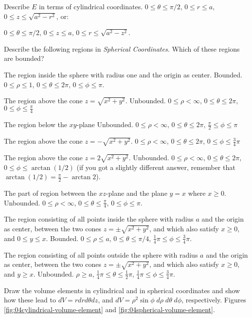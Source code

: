 \subprob  Describe $E$ in terms of cylindrical coordinates. 
\answer
$0\le\theta\le\pi/2$, $0\le r\le a$, $0\le z\le \sqrt{a^2-r^2}$, or:

$0\le\theta\le\pi/2$, $0\le z\le a$, $0\le r\le \sqrt{a^2-z^2}$.
\endanswer

\problem Describe the following regions in \emph{Spherical Coordinates.}  Which of these regions are bounded?

\subprob The region inside the sphere with radius one and the origin as center.
\answer
Bounded.  $0\le\rho\le 1$, $0\le\theta\le2\pi$, $0\le\phi\le\pi$.
\endanswer

\subprob The region above the cone $z= \sqrt{x^2+y^2}$.
\answer
Unbounded.  $0\le \rho<\infty$, $0\le\theta\le 2\pi$, $0\le\phi\le \frac\pi4$
\endanswer

\subprob The region below the $xy$-plane
\answer
Unbounded.  $0\le \rho<\infty$, $0\le\theta\le 2\pi$, $\frac\pi2 \le \phi \le \pi$
\endanswer

\subprob The region above the cone $z= - \sqrt{x^2+y^2}$.
\answer
$0\le \rho<\infty$, $0\le\theta\le 2\pi$, $0\le\phi\le \frac34\pi$
\endanswer

\subprob The region above the cone $z=2\sqrt{x^2+y^2}$.
\answer
Unbounded.
$0\le \rho<\infty$, $0\le\theta\le 2\pi$, $0\le\phi\le \arctan(1/2)$
(if you got a slightly different answer, remember that $\arctan(1/2) = \frac{\pi} {2} - \arctan 2$).
\endanswer

\subprob The part of region between the $xz$-plane and the plane $y=x$ where $x\ge0$.
\answer
Unbounded.  $0\le\rho<\infty$, $0\le\theta\le\frac\pi4$, $0\le\phi\le\pi$.
\endanswer

\subprob The region consisting of all points inside the sphere with radius $a$ and the origin as center, between the two cones $z=\pm\sqrt{x^2+y^2}$, and which also satisfy $x\ge0$, and $0\le y \le x$.
\answer
Bounded.  $0\le\rho\le a$, $0\le\theta\le\pi/4$, $\frac14\pi\le\phi\le\frac34\pi$.
\endanswer

\subprob The region consisting of all points outside the sphere with radius $a$ and the origin as center, between the two cones $z=\pm\sqrt{x^2+y^2}$, and which also satisfy $x\ge0$, and $y \ge x$.
\answer
Unbounded.  $\rho\ge a$, $\frac14\pi\le\theta\le\frac12\pi$, $\frac14\pi\le\phi\le\frac34\pi$.
\endanswer


\problem Draw the volume elements in cylindrical and in spherical 
coordinates and show how these lead to $dV = rdrd\theta dz$, and
$dV = \rho^2\sin\phi\; d\rho\; d\theta\; d\phi$, respectively.
\answer
Figures \ref{fig:04cylindrical-volume-element} and
\ref{fig:04spherical-volume-element}.
\endanswer

